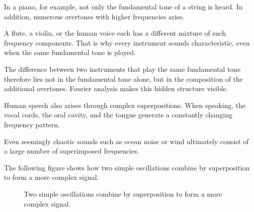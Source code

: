 In a piano, for example, not only the fundamental tone of a string is heard.
In addition, numerous overtones with higher frequencies arise.

A flute,
a violin,
or the human voice
each has a different mixture of such frequency components.
That is why every instrument sounds characteristic,
even when the same fundamental tone is played.

The difference between two instruments
that play the same fundamental tone
therefore lies not in the fundamental tone alone,
but in the composition of the additional overtones.
Fourier analysis makes this hidden structure visible.

Human speech also arises through complex superpositions.
When speaking, the vocal cords,
the oral cavity,
and the tongue generate a constantly changing frequency pattern.

Even seemingly chaotic sounds such as ocean noise or wind
ultimately consist of a large number of superimposed frequencies.


The following figure shows
how two simple oscillations
combine by superposition to form a more complex signal.
\FloatBarrier
\begin{figure}[H]
	\centering
	\caption{Two simple oscillations combine by superposition to form a more complex signal.}
	\label{fig:ueberlagerung}
\end{figure}

